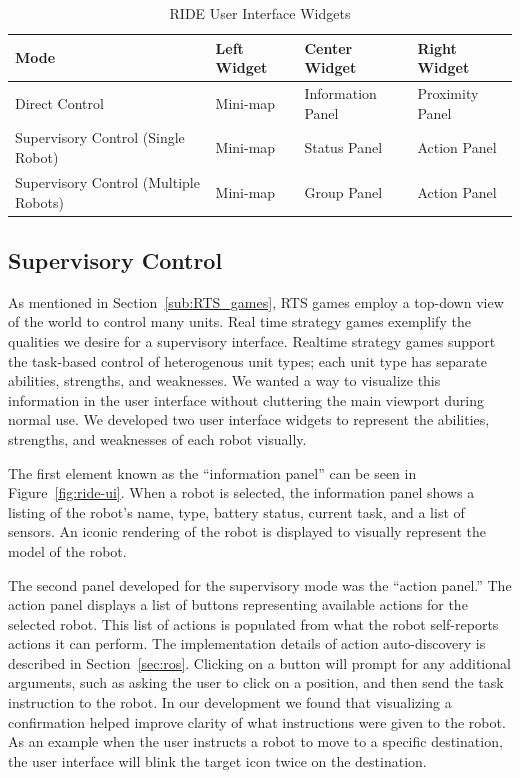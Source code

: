 \begin{table}[ht]
\label{tab:ui-widgets}
\begin{center}
    \begin{tabular}{ | p{4cm} | l | l | l |}
    \hline
    \textbf{Mode} & \textbf{Left Widget} & \textbf{Center Widget} & \textbf{Right Widget} \\ \hline
    Direct Control & Mini-map & Information Panel & Proximity Panel \\ \hline
    Supervisory Control (Single Robot) & Mini-map & Status Panel & Action Panel \\ \hline
    Supervisory Control (Multiple Robots) & Mini-map & Group Panel & Action Panel \\ \hline
    \hline
    \end{tabular}
    \caption{RIDE User Interface Widgets}
\end{center}
\end{table}

\subsection{Supervisory Control}
\label{subs:ui-supervisor}

As mentioned in Section~\ref{sub:RTS_games}, RTS games employ a top-down view of the world to control many units. Real time strategy games exemplify the qualities we desire for a supervisory interface. Realtime strategy games support the task-based control of heterogenous unit types; each unit type has separate abilities, strengths, and weaknesses. We wanted a way to visualize this information in the user interface without cluttering the main viewport during normal use. We developed two user interface widgets to represent the abilities, strengths, and weaknesses of each robot visually.

The first element known as the ``information panel'' can be seen in Figure~\ref{fig:ride-ui}. When a robot is selected, the information panel shows a listing of the robot's name, type, battery status, current task, and a list of sensors. An iconic rendering of the robot is displayed to visually represent the model of the robot.

The second panel developed for the supervisory mode was the ``action panel.'' The action panel displays a list of buttons representing available actions for the selected robot. This list of actions is populated from what the robot self-reports actions it can perform. The implementation details of action auto-discovery is described in Section~\ref{sec:ros}. Clicking on a button will prompt for any additional arguments, such as asking the user to click on a position, and then send the task instruction to the robot. In our development we found that visualizing a confirmation helped improve clarity of what instructions were given to the robot. As an example when the user instructs a robot to move to a specific destination, the user interface will blink the target icon twice on the destination.  

